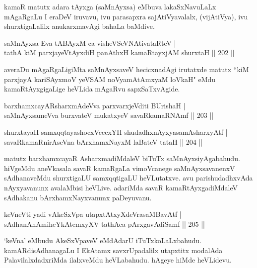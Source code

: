 \begin{artha}
kamaR matutx adara tAyxga (saMnAyxsa) eMbuva lakaSxNavuLaLx mAgaRgaLu I eraDeV iruvavu, ivu parasapxra sajAtiVyavalalx, (vijAtiVya), ivu shurxtigaLalilx anukarxmavAgi bahaLa baMdive.
\end{artha}

\begin{shl}
saMnAyxsa Eva tABAyxM ca visheVSeVNAtivataRteV |\\
tathA kiM parxjayeVtAyxdiH panAthxH kamaRtayxjAM shurxtaH \hfill || 202 ||
\end{shl}

\begin{artha}
averaDu mAgaRgaLigiMta saMnAyxsaveV hecicxnadAgi irutatxde matutx ``kiM parxjayA kariSAyxmoV yeVSAM noVyamAtAmxyaM loVkaH" eMdu kamaRtAyxgigaLige heVLida mAgaRvu sapxSaTxvAgide.
\end{artha}

\begin{shl}
barxhamxcayARsharxmAdeVva parxvarxjeVditi BUrishaH |\\
saMnAyxsameVva burxvateV mukatxyeV savaRkamaRNAmf \hfill || 203 ||
\end{shl}

\begin{shl}
shurxtayaH samxqqtayashocxVcecxYH shudadhxnAyxyasamAsharxyAtf |\\
savaRkamaRnirAseVna bArxhamxNayxM laBateV tataH \hfill || 204 ||
\end{shl}

\begin{artha}%
matutx barxhamxcayaR AsharxmadiMdaleV biTuTx saMnAyxsiyAgabahudu. hiVgeMdu aneVkasala savaR kamaRgaLa vimoVcanege saMnAyxsavanenxV sAdhanaveMdu shurxtigaLU samxqqtigaLU heVLutatxve. avu parishudadhxvAda nAyxyavanunx avalaMbisi heVLive. adariMda savaR kamaRtAyxgadiMdaleV sAdhakanu bArxhamxNayxvanunx paDeyuvanu.
\end{artha}

\begin{shl}
keVneVti yadi vA\s \s keSxVpa utapxtAtxyXdeVrasaMBavAtf |\\
sAdhanAnAmiheYkAtemxyXV tathAca pArxgavAdiSamf \hfill || 205 ||
\end{shl}

\begin{artha}
`keVna' eMbudu AkeSxVpaveV eMdAdarU iTuTxkoLaLxbahudu. kamARdisAdhanagaLu I EkAtamx savxrUpadalilx utapxtitx modalAda PalavilalxdadxriMda ilalxveMdu heVLabahudu. hAgeye hiMde heVLidevu.
\end{artha}

